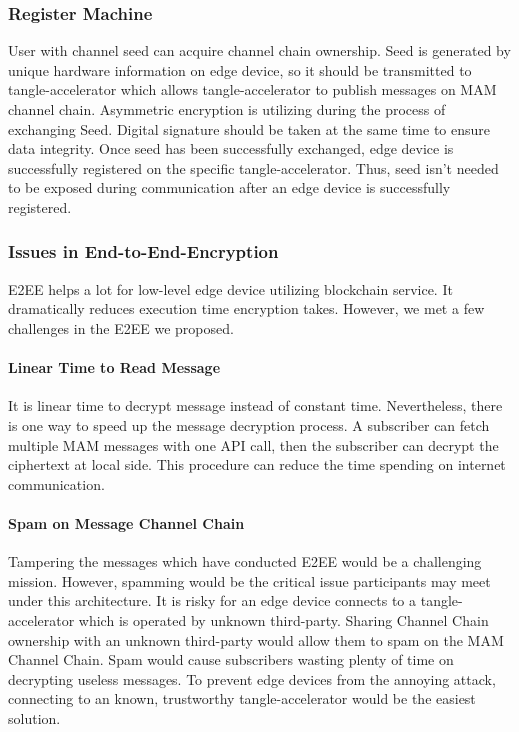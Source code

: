 \documentclass[conference]{IEEEtran}
\begin{document}
\subsubsection{Register Machine}
User with channel seed can acquire channel chain ownership. Seed is generated by unique hardware information on edge device, so it should be transmitted to tangle-accelerator which allows tangle-accelerator to publish messages on MAM channel chain. Asymmetric encryption is utilizing during the process of exchanging Seed. Digital signature should be taken at the same time to ensure data integrity. Once seed has been successfully exchanged, edge device is successfully registered on the specific tangle-accelerator. Thus, seed isn't needed to be exposed during communication after an edge device is successfully registered.

\subsubsection{Issues in End-to-End-Encryption}
E2EE helps a lot for low-level edge device utilizing blockchain service. It dramatically reduces execution time encryption takes. However, we met a few challenges in the E2EE we proposed.

\paragraph{Linear Time to Read Message}
It is linear time to decrypt message instead of constant time. Nevertheless, there is one way to speed up the message decryption process. A subscriber can fetch multiple MAM messages with one API call, then the subscriber can decrypt the ciphertext at local side. This procedure can reduce the time spending on internet communication.

\paragraph{Spam on Message Channel Chain}
Tampering the messages which have conducted E2EE would be a challenging mission. However, spamming would be the critical issue participants may meet under this architecture. It is risky for an edge device connects to a tangle-accelerator which is operated by unknown third-party. Sharing Channel Chain ownership with an unknown third-party would allow them to spam on the MAM Channel Chain. Spam would cause subscribers wasting plenty of time on decrypting useless messages. To prevent edge devices from the annoying attack, connecting to an known, trustworthy tangle-accelerator would be the easiest solution.
\end{document}
